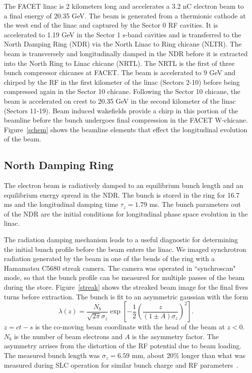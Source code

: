 \documentclass[%
twocolumn,
showpacs,preprintnumbers,
 aps,
prstab,
]{revtex4-1}
\begin{document}
The FACET linac is 2 kilometers long and accelerates a 3.2 nC electron beam to a final energy of 20.35 GeV. The beam is generated from a thermionic cathode at the west end of the linac and captured by the Sector 0 RF cavities. It is accelerated to 1.19 GeV in the Sector 1 s-band cavities and is transferred to the North Damping Ring (NDR) via the North Linac to Ring chicane (NLTR). The beam is transversely and longitudinally damped in the NDR before it is extracted into the North Ring to Linac chicane (NRTL). The NRTL is the first of three bunch compressor chicanes at FACET. The beam is accelerated to 9 GeV and chirped by the RF in the first kilometer of the linac (Sectors 2-10) before being compressed again in the Sector 10 chicane. Following the Sector 10 chicane, the beam is accelerated on crest to 20.35 GeV in the second kilometer of the linac (Sectors 11-19). Beam induced wakefields provide a chirp in this portion of the beamline before the bunch undergoes final compression in the FACET W-chicane. Figure~\ref{schem} shows the beamline elements that effect the longitudinal evolution of the beam.

\subsection{North Damping Ring}\label{NDR}

The electron beam is radiatively damped to an equilibrium bunch length and an equilibrium energy spread in the NDR. The bunch is stored in the ring for 16.7 ms and the longitudinal damping time $\tau_z = 1.79$ ms. The bunch parameters out of the NDR are the initial conditions for longitudinal phase space evolution in the linac.

The radiation damping mechanism leads to a useful diagnostic for determining the initial bunch profile before the beam enters the linac. We imaged synchrotron radiation generated by the beam in one of the bends of the ring with a Hamamatsu C5680 streak camera. The camera was operated in ``synchroscan" mode, so that the bunch profile can be measured for multiple passes of the beam during the store. Figure~\ref{streak} shows the streaked beam image for the final fives turns before extraction.  The bunch is fit to an asymmetric gaussian with the form
\begin{equation}
 \lambda(z) = \frac{N_b}{\sqrt{2\pi}\sigma_z}\exp{ \left[-\frac{1}{2}\left(\frac{z}{(1\pm A)\sigma_z}\right)^2\right]}.
\end{equation}
$z = ct-s$ is the co-moving beam coordinate with the head of the beam at $z < 0$. $N_b$ is the number of beam electrons and $A$ is the asymmetry factor.  The asymmetry arrises from the distortion of the RF potential due to beam loading. The measured bunch length was $\sigma_z = 6.59$ mm, about 20\% longer than what was measured during SLC operation for similar bunch charge and RF parameters~\cite{Holtzapple}.
\end{document}
